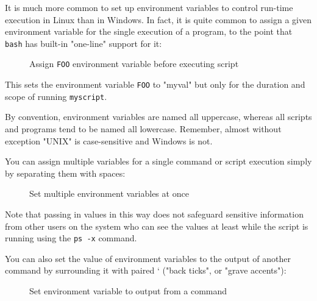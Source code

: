 \documentclass[10pt,american,]{book}
\makeatletter
\newenvironment{Shaded}{\begin{snugshade}}{\end{snugshade}}
\newcommand{\KeywordTok}[1]{\textcolor[rgb]{0.13,0.29,0.53}{\textbf{{#1}}}}
\newcommand{\OtherTok}[1]{\textcolor[rgb]{0.56,0.35,0.01}{{#1}}}
\newcommand{\NormalTok}[1]{{#1}}
\numberwithin{figure}{chapter}
\DeclareRobustCommand{\drcap}[1]{\begin{figure}[H]\caption{#1}\end{figure}}
\DeclareRobustCommand{\drcmd}[1]{\index{commands!#1@\texttt{#1}}}
\renewcommand{\KeywordTok}[1]{{#1}}
\renewcommand{\OtherTok}[1]{{#1}}
\renewcommand{\NormalTok}[1]{{#1}}
\makeatother
\begin{document}
It is much more common to set up environment variables to control
run-time execution in Linux than in Windows. In fact, it is quite common
to assign a given environment
variable for the single execution of a program, to the point that
\texttt{bash} has built-in "one-line" support for it:

\drcap{Assign \texttt{FOO} environment variable before executing script}

\begin{Shaded}
\end{Shaded}

This sets the environment variable \texttt{FOO} to "myval" but only for
the duration and scope of running \texttt{myscript}.

By convention, environment variables are named all uppercase, whereas
all scripts and programs tend to be named all lowercase. Remember,
almost without exception "UNIX" is case-sensitive and Windows is not.

You can assign multiple variables for a single command or script
execution simply by separating them with spaces:

\drcap{Set multiple environment variables at once}

\begin{Shaded}
\end{Shaded}

Note that passing in values in this way does not safeguard sensitive
information from other users on the system who can see the values at
least while the script is running using the \texttt{ps\ -x}\drcmd{ps}
command.

You can also set the value of environment variables to the output of
another command by surrounding it with paired ` ("back ticks", or "grave
accents"):

\drcap{Set environment variable to output from a command}

\begin{Shaded}
\end{Shaded}
\end{document}

